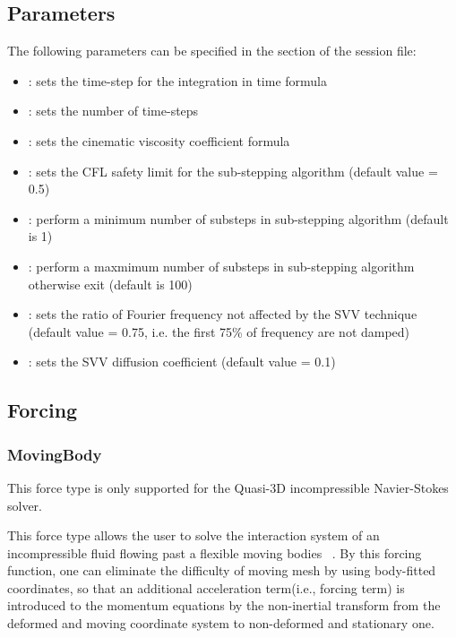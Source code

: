 \subsection{Parameters}
The following parameters can be specified in the  section of
the session file:

\begin{itemize}
\item {}: sets the time-step for the integration in time formula
\item {}: sets the number of time-steps
\item {}: sets the cinematic viscosity coefficient formula
\item {}: sets the CFL safety limit for the sub-stepping algorithm (default value = 0.5)
\item {}: perform a minimum number of substeps in sub-stepping algorithm (default is 1)
\item {}: perform a maxmimum  number of substeps in sub-stepping algorithm otherwise exit (default is 100)
\item {}: sets the ratio of Fourier frequency not affected by the SVV technique (default value = 0.75, i.e. the first 75\% of frequency are not damped)
\item {}: sets the SVV diffusion coefficient (default value = 0.1)
\end{itemize}

\subsection{Forcing}
\subsubsection{MovingBody}

\begin{notebox}
This force type is only supported for the Quasi-3D incompressible Navier-Stokes solver.
\end{notebox}

This force type allows the user to solve the interaction system of an incompressible fluid flowing past a flexible moving bodies ~\cite{NeKa97}. By this forcing function, one can eliminate the difficulty of moving mesh by using body-fitted coordinates, so that an additional acceleration term(i.e., forcing term) is introduced to the momentum equations by the non-inertial transform from the deformed and moving coordinate system to non-deformed and stationary one.

